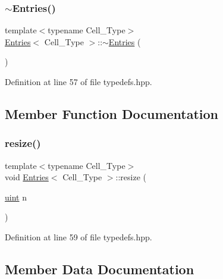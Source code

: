 \mbox{\label{class_entries_aeda42186376731bd3a9b3902a09395a4}} 
\subsubsection{\texorpdfstring{$\sim$\+Entries()}{~Entries()}}
{\footnotesize\ttfamily template$<$typename Cell\+\_\+\+Type$>$ \\
\hyperlink{class_entries}{Entries}$<$ Cell\+\_\+\+Type $>$\+::$\sim$\hyperlink{class_entries}{Entries} (\begin{DoxyParamCaption}{ }\end{DoxyParamCaption})\hspace{0.3cm}{\ttfamily [inline]}}



Definition at line 57 of file typedefs.\+hpp.



\subsection{Member Function Documentation}
\mbox{\label{class_entries_a8b539e4c53aab5d6ce8305af346b7089}} 
\subsubsection{\texorpdfstring{resize()}{resize()}}
{\footnotesize\ttfamily template$<$typename Cell\+\_\+\+Type$>$ \\
void \hyperlink{class_entries}{Entries}$<$ Cell\+\_\+\+Type $>$\+::resize (\begin{DoxyParamCaption}\item[{\hyperlink{typedefs_8hpp_a91ad9478d81a7aaf2593e8d9c3d06a14}{uint}}]{n }\end{DoxyParamCaption})\hspace{0.3cm}{\ttfamily [inline]}}



Definition at line 59 of file typedefs.\+hpp.



\subsection{Member Data Documentation}
\mbox{\label{class_entries_a6a7c589df4cd6ea98386466440dfdc98}} 
